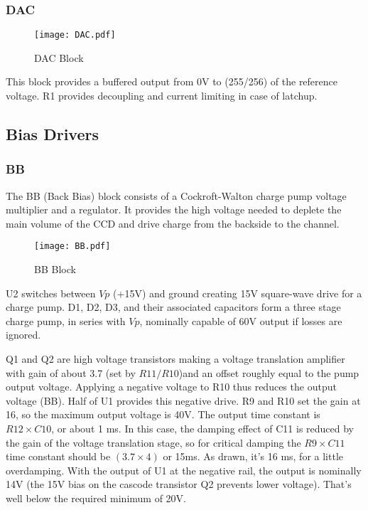 \subsubsection{DAC}

   \begin{figure}
   \begin{center}
   \texttt{[image: DAC.pdf]}
   \end{center}
   \caption{DAC Block}
   \end{figure}
This block provides a buffered output from 0V to (255/256) of the reference voltage. R1 provides decoupling and current limiting in case of latchup.

\subsection{Bias Drivers}
\subsubsection{BB}

The BB (Back Bias) block consists of a Cockroft-Walton charge pump voltage multiplier and a regulator. It provides the high voltage needed to deplete the main volume of the CCD and drive charge from the backside to the channel.

   \begin{figure}
   \begin{center}
   \texttt{[image: BB.pdf]}
   \end{center}
   \caption{BB Block}
   \end{figure}

U2 switches between $Vp$ (+15V) and ground creating 15V square-wave drive for a charge pump. D1, D2, D3, and their associated capacitors form a three stage charge pump, in series with $Vp$, nominally capable of 60V output if losses are ignored. 

Q1 and Q2 are high voltage transistors making a voltage translation amplifier with gain of about 3.7 (set by $R11/R10$)and an offset roughly equal to the pump output voltage. Applying a negative voltage to R10 thus reduces the output voltage (BB). Half of U1 provides this negative drive. R9 and R10 set the gain at 16, so the maximum output voltage is 40V. The output time constant is $R12\times C10$, or about 1 ms. In this case, the damping effect of C11 is reduced by the gain of the voltage translation stage, so for critical damping the $R9\times C11$ time constant should be $(3.7\times4)$ or 15ms. As drawn, it's 16 ms, for a little overdamping. With the output of U1 at the negative rail, the output is nominally 14V (the 15V bias on the cascode transistor Q2 prevents lower voltage). That's well below the required minimum of 20V.

